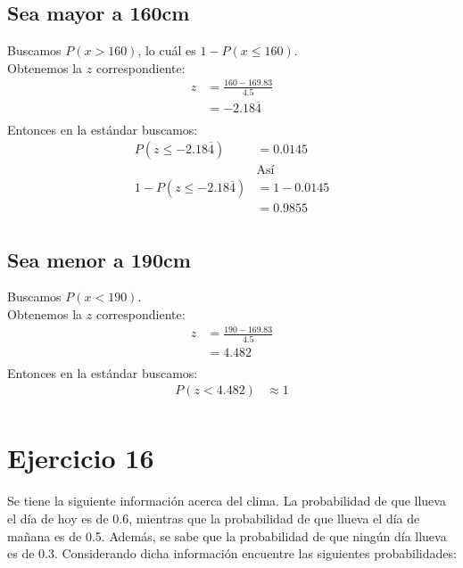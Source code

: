 \documentclass[12pt]{article}
\begin{document}
\subsection{Sea mayor a 160cm}
Buscamos $P(x > 160)$, lo cuál es $1 - P(x \leq 160)$.\\
Obtenemos la $z$ correspondiente:
\begin{equation}
\begin{split}
z &= \frac{160 - 169.83}{4.5}\\
&= -2.18\overline{4}\\
\end{split}
\end{equation}
Entonces en la estándar buscamos: 
\begin{equation}
\begin{split}
P(z \leq -2.18\overline{4})&= 0.0145\\
&\text{Así}\\
1 - P(z \leq -2.18\overline{4})&=  1 - 0.0145\\
&= 0.9855\\
\end{split}
\end{equation}
\subsection{Sea menor a 190cm}
Buscamos $P(x < 190)$.\\
Obtenemos la $z$ correspondiente:
\begin{equation}
\begin{split}
z &= \frac{190 - 169.83}{4.5}\\
&= 4.482\\
\end{split}
\end{equation}
Entonces en la estándar buscamos: 
\begin{equation}
\begin{split}
P(z < 4.482)&\approx 1\\
\end{split}
\end{equation}
\section{Ejercicio 16}
Se tiene la siguiente información acerca del clima. La probabilidad de que llueva el día de hoy
es de 0.6, mientras que la probabilidad de que llueva el día de mañana es de 0.5. Además, se
sabe que la probabilidad de que ningún día llueva es de 0.3. Considerando dicha información
encuentre las siguientes probabilidades:
\end{document}
